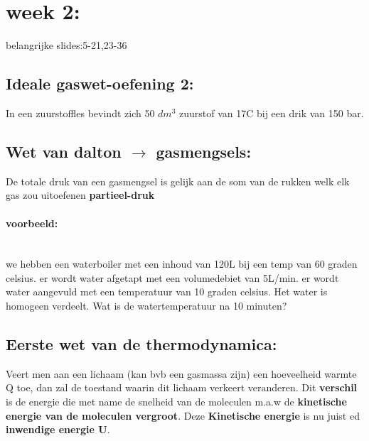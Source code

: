 \documentclass[12pt]{article}
\newcommand{\myparagraph}[1]{\paragraph{#1}\mbox{}\\}
\begin{document}
\section{week 2:}
belangrijke slides:5-21,23-36
\subsection{Ideale gaswet-oefening 2:}
In een zuurstoffles bevindt zich 50 $dm^3$ zuurstof van 17C bij een drik van 150 bar.
\subsection{Wet van dalton $\rightarrow$ gasmengsels:}
De totale druk van een gasmengsel is gelijk aan de som van de rukken welk elk gas zou uitoefenen \textbf{partieel-druk}
\myparagraph{voorbeeld:}
we hebben een waterboiler met een inhoud van 120L bij een temp van 60 graden celsius.
er wordt water afgetapt met een volumedebiet van 5L/min. er wordt water aangevuld met een temperatuur van 10 graden celsius. Het water is homogeen verdeelt.
Wat is de watertemperatuur na 10 minuten?
\subsection{Eerste wet van de thermodynamica:}
Veert men aan een lichaam (kan bvb een gasmassa zijn) een hoeveelheid warmte Q toe, dan zal de toestand waarin dit lichaam verkeert veranderen. Dit \textbf{verschil} is de energie die met name de snelheid van de moleculen m.a.w de \textbf{kinetische energie van de moleculen vergroot}. Deze \textbf{Kinetische energie} is nu juist ed \textbf{inwendige energie U}.
\end{document}
